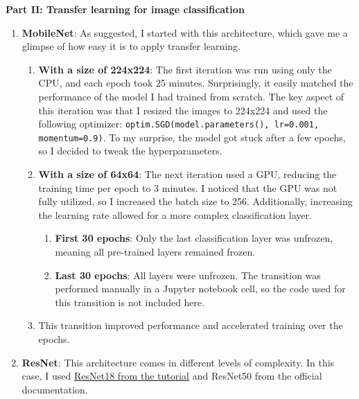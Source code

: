 \documentclass{cpsc202}
\begin{document}
    \large\textbf{Part II: Transfer learning for image classification}

    \begin{enumerate}
        \item \textbf{MobileNet}: As suggested, I started with this architecture, which gave me a glimpse of how easy it is to apply transfer learning.
        \begin{enumerate}
            \item \textbf{With a size of 224x224}: The first iteration was run using only the CPU, and each epoch took 25 minutes.
            Surprisingly, it easily matched the performance of the model I had trained from scratch.
            The key aspect of this iteration was that I resized the images to 224x224 and used the following optimizer:
            \lstinline|optim.SGD(model.parameters(), lr=0.001, momentum=0.9)|.
            To my surprise, the model got stuck after a few epochs, so I decided to tweak the hyperparameters.

            \item \textbf{With a size of 64x64}: The next iteration used a GPU, reducing the training time per epoch to 3 minutes.
            I noticed that the GPU was not fully utilized, so I increased the batch size to 256.
            Additionally, increasing the learning rate allowed for a more complex classification layer.

            \begin{enumerate}
                \item \textbf{First 30 epochs}: Only the last classification layer was unfrozen, meaning all pre-trained layers remained frozen.
                \item \textbf{Last 30 epochs}: All layers were unfrozen.
                The transition was performed manually in a Jupyter notebook cell, so the code used for this transition is not included here.
            \end{enumerate}

            \item This transition improved performance and accelerated training over the epochs.
        \end{enumerate}

        \item \textbf{ResNet}: This architecture comes in different levels of complexity.
        In this case, I used \href{https://pytorch.org/tutorials/beginner/transfer_learning_tutorial.html}{ResNet18 from the tutorial} and ResNet50 from the official documentation.


\end{enumerate}
\end{document}
